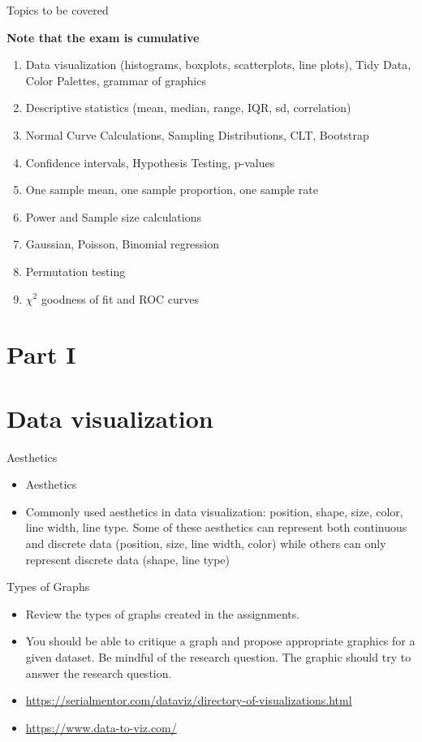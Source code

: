 \documentclass[10pt,handout]{beamer}\usepackage[]{graphicx}\usepackage[]{color}
\begin{document}
\begin{frame}{Topics to be covered}
	
	\textbf{Note that the exam is cumulative}
	
	\begin{enumerate}
		\setlength\itemsep{.51em}
		\item Data visualization (histograms, boxplots, scatterplots, line plots), Tidy Data, Color Palettes, grammar of graphics
		\item Descriptive statistics (mean, median, range, IQR, sd, correlation)
		\item Normal Curve Calculations, Sampling Distributions, CLT, Bootstrap
		\item Confidence intervals, Hypothesis Testing, p-values 
		\item One sample mean, one sample proportion, one sample rate
		\item Power and Sample size calculations
		\item Gaussian, Poisson, Binomial regression
		\item Permutation testing
		\item $\chi^2$ goodness of fit and ROC curves
	\end{enumerate}
	
\end{frame}

\section{Part I}

\section{Data visualization}

\begin{frame}{Aesthetics}
	\begin{itemize}
		\setlength\itemsep{.51em}
		\item Aesthetics
		\pause 
		\item Commonly used aesthetics in data visualization: position, shape, size, color, line width, line type. Some of these aesthetics can represent both continuous and discrete data (position, size, line width, color) while others can only represent discrete data (shape, line type)	
	\end{itemize}
\end{frame}

\begin{frame}{Types of Graphs}
	\begin{itemize}
		\item Review the types of graphs created in the assignments.
		\item You should be able to critique a graph and propose appropriate graphics for a given dataset. Be mindful of the research question. The graphic should try to answer the research question. 
		\item \url{https://serialmentor.com/dataviz/directory-of-visualizations.html}
		\item \url{https://www.data-to-viz.com/}
	\end{itemize}
\end{frame}
\end{document}

